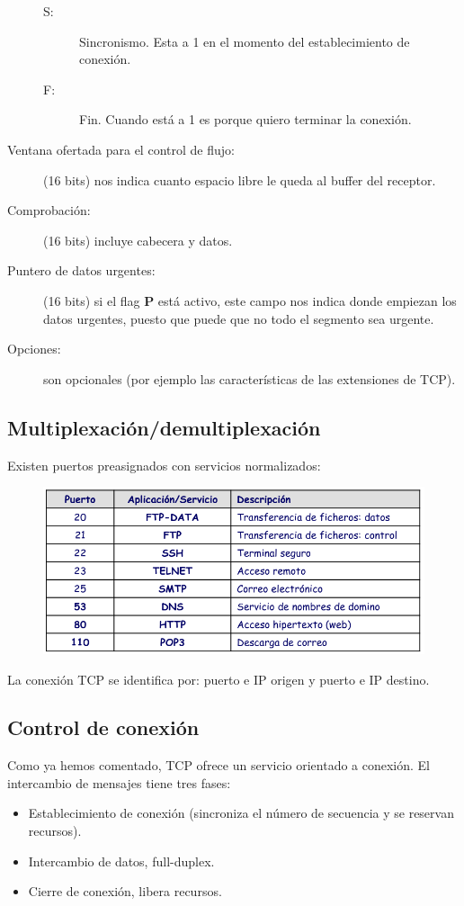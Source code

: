 \begin{description}
\begin{description}
            \item [S:] Sincronismo. Esta a 1 en el momento del establecimiento de conexión.
            \item [F:] Fin. Cuando está a 1 es porque quiero terminar la conexión. 
        \end{description}
    \item [Ventana ofertada para el control de flujo:] (16 bits) nos indica cuanto espacio libre le queda al buffer del receptor. 
    \item [Comprobación:] (16 bits) incluye cabecera y datos. 
    \item [Puntero de datos urgentes:] (16 bits) si el flag \textbf{P} está activo, este campo nos indica donde empiezan los datos urgentes, puesto que puede que no todo el segmento sea urgente.
    \item [Opciones:] son opcionales (por ejemplo las características de las extensiones de TCP).
\end{description}

\subsection{Multiplexación/demultiplexación}
Existen puertos preasignados con servicios normalizados:
\begin{figure}[H]
    \centering
    \includegraphics[width=0.6\linewidth]{./images/puertos-tcp.png}
\end{figure}

La conexión TCP se identifica por: puerto e IP origen y puerto e IP destino.
\subsection{Control de conexión}
Como ya hemos comentado, TCP ofrece un servicio orientado a conexión. El intercambio de mensajes tiene tres fases:
\begin{itemize}
    \item Establecimiento de conexión (sincroniza el número de secuencia y se reservan recursos).
    \item Intercambio de datos, full-duplex.
    \item Cierre de conexión, libera recursos.
\end{itemize}


